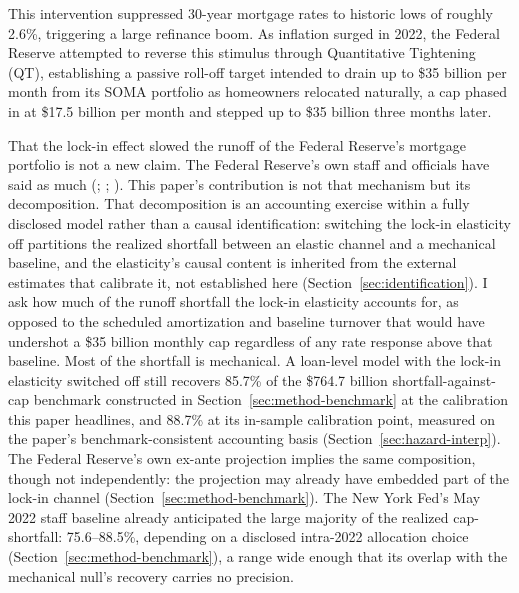 \documentclass[12pt]{article}
\begin{document}
This intervention suppressed 30-year mortgage rates to historic lows of roughly 2.6\%, triggering a large refinance boom. As inflation surged in 2022, the Federal Reserve attempted to reverse this stimulus through Quantitative Tightening (QT), establishing a passive roll-off target intended to drain up to \$35 billion per month from its SOMA portfolio as homeowners relocated naturally, a cap phased in at \$17.5 billion per month and stepped up to \$35 billion three months later.

That the lock-in effect slowed the runoff of the Federal Reserve's mortgage portfolio is not a new claim. The Federal Reserve's own staff and officials have said as much (\citealp{na2024}; \citealp{perli2024}; \citealp{hammack2025}). This paper's contribution is not that mechanism but its decomposition. That decomposition is an accounting exercise within a fully disclosed model rather than a causal identification: switching the lock-in elasticity off partitions the realized shortfall between an elastic channel and a mechanical baseline, and the elasticity's causal content is inherited from the external estimates that calibrate it, not established here (Section~\ref{sec:identification}). I ask how much of the runoff shortfall the lock-in elasticity accounts for, as opposed to the scheduled amortization and baseline turnover that would have undershot a \$35 billion monthly cap regardless of any rate response above that baseline. Most of the shortfall is mechanical. A loan-level model with the lock-in elasticity switched off still recovers 85.7\% of the \$764.7 billion shortfall-against-cap benchmark constructed in Section~\ref{sec:method-benchmark} at the calibration this paper headlines, and 88.7\% at its in-sample calibration point, measured on the paper's benchmark-consistent accounting basis (Section~\ref{sec:hazard-interp}). The Federal Reserve's own ex-ante projection implies the same composition, though not independently: the projection may already have embedded part of the lock-in channel (Section~\ref{sec:method-benchmark}). The New York Fed's May 2022 staff baseline already anticipated the large majority of the realized cap-shortfall: 75.6--88.5\%, depending on a disclosed intra-2022 allocation choice (Section~\ref{sec:method-benchmark}), a range wide enough that its overlap with the mechanical null's recovery carries no precision.
\end{document}
